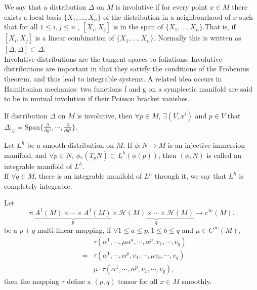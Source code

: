 \begin{newdef}
We say that a distribution $\Delta$ on $M$ is involutive if for every point $x \in M$ there exists a local basis $\{X_{1},\ldots ,X_{n}\}$ of the distribution in a neighbourhood of $x$ such that for all $1\leq i,j\leq n$ , $[X_{i},X_{j}]$  is in the span of $\{X_{1},\ldots ,X_{n}\}$.That is, if $[X_{i},X_{j}]$ is a linear combination of $\{X_{1},\ldots ,X_{n}\}$. Normally this is written as $ [\Delta ,\Delta ]\subset \Delta $.\\
Involutive distributions are the tangent spaces to foliations. Involutive distributions are important in that they satisfy the conditions of the Frobenius theorem, and thus lead to integrable systems.
A related idea occurs in Hamiltonian mechanics: two functions f and g on a symplectic manifold are said to be in mutual involution if their Poisson bracket vanishes.
\end{newdef}

\begin{newthem}
 If distribution $\Delta$ on $M$ is involutive, then $\forall p \in M$, $\exists (V,x^i)$ and $p \in V$ that $\Delta|_{V} = \mathrm{Span} \{ \frac{\partial}{\partial y^1} , \cdots, \frac{\partial}{\partial y^h}\}$.
\end{newthem}

\begin{newdef}
Let $L^{h}$ be a smooth distribution on $M$. If $\phi:N \to M$ is an injective immersion manifold, and $\forall p \in N$, $\phi_{*}(T_pN) \subset L^h(\phi(p))$, then $(\phi,N)$ is called an integrable manifold of $L^h$.\\
If $\forall q \in M$, there is an integrable manifold of $L^h$ through it, we say that $L^h$ is completely integrable.
\end{newdef}
\begin{newthem}
Let
\[\tau: \underbrace{A^1(M) \times \cdots \times A^1(M)}_p \times \underbrace{\mathcal{H}(M) \times \cdots \times \mathcal{H}(M)}_q \to c^{\infty}(M).\] 
be a $p+q$ multi-linear mapping, if $\forall 1 \leq a \leq p,1 \leq b \leq q$ and $\mu \in C^{\infty}(M)$,
\begin{eqnarray}
&&\tau(\alpha^1,\cdots,\mu \alpha^{a},\cdots,\alpha^p,v_1,\cdots,v_q)\nonumber \\
&=&\tau(\alpha^1,\cdots,\alpha^p,v_1,\cdots,\mu v_{b},\cdots,v_q)\nonumber \\
&=&\mu \cdot \tau(\alpha^1,\cdots,\alpha^p,v_1,\cdots,v_q), \nonumber
\end{eqnarray}
then the mapping $\tau$ define a $(p,q)$ tensor for all $x \in M$ smoothly.
\end{newthem}

